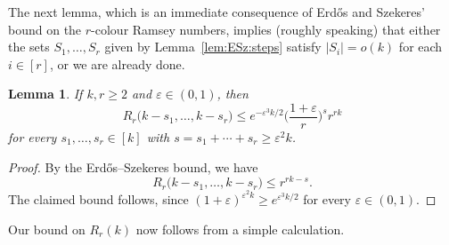 \documentclass[12pt,reqno]{amsart}
\newtheorem{lemma}[theorem]{Lemma}
\theoremstyle{definition}
\theoremstyle{remark}
\newcommand\eps{\varepsilon}
\renewcommand{\le}{\leqslant}
\renewcommand{\ge}{\geqslant}
\def\eps{\varepsilon}
\begin{document}
The next lemma, which is an immediate consequence of Erd\H{o}s and Szekeres' bound on the $r$-colour Ramsey numbers, implies (roughly speaking) that either the sets $S_1,\dots,S_r$ given by Lemma~\ref{lem:ESz:steps} satisfy $|S_i| = o(k)$ for each $i \in [r]$, or we are already done.

\begin{lemma}\label{lem:many:ESz:steps}
If\/ $k,r \ge 2$ and\/ $\eps \in (0,1)$, then 
$$R_r\big( k - s_1, \ldots, k - s_r \big) \le e^{-\eps^3 k / 2} \bigg( \frac{1+\eps}{r} \bigg)^s r^{rk}$$
for every $s_1,\ldots,s_r \in [k]$ with\/ $s = s_1 + \cdots + s_r \ge \eps^2 k$.
\end{lemma}

\begin{proof}
By the Erd\H{o}s--Szekeres bound, we have
$$R_r\big( k - s_1, \ldots, k - s_r \big) \le r^{rk - s}.$$
The claimed bound follows, since $( 1 + \eps )^{\eps^2 k} \ge e^{\eps^3 k/2}$ for every $\eps \in (0,1)$.
\end{proof}

Our bound on $R_r(k)$ now follows from a simple calculation. 
\end{document}
